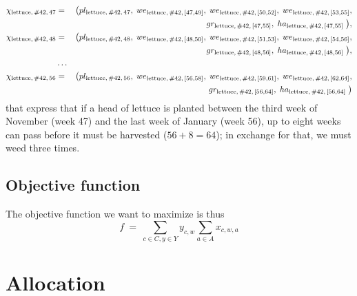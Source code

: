 \documentclass[11pt,reqno]{amsart}
\numberwithin{equation}{section}
\begin{document}
\begin{eqnarray*}
    \chi_{\text{lettuce},\, \text{\#42},\, 47} 
   &=& 
   \big(
      pl_{\text{lettuce},\, \text{\#42},\, 47}, \; 
      we_{\text{lettuce},\, \text{\#42},\, [47,49]}, \;
      we_{\text{lettuce},\, \text{\#42},\, [50,52]}, \;
      we_{\text{lettuce},\, \text{\#42},\, [53,55]}, 
   \\ && \hspace{5.4cm}
      gr_{\text{lettuce},\, \text{\#42},\, [47,55]}, \;
      ha_{\text{lettuce},\, \text{\#42},\, [47,55]} \;
      \big), \\
    \chi_{\text{lettuce},\, \text{\#42},\, 48} 
   &=& 
   \big(
      pl_{\text{lettuce},\, \text{\#42},\, 48}, \; 
      we_{\text{lettuce},\, \text{\#42},\, [48,50]}, \;
      we_{\text{lettuce},\, \text{\#42},\, [51,53]}, \;
      we_{\text{lettuce},\, \text{\#42},\, [54,56]}, 
   \\ && \hspace{5.4cm}
      gr_{\text{lettuce},\, \text{\#42},\, [48,56]}, \;
      ha_{\text{lettuce},\, \text{\#42},\, [48,56]} \;
      \big), \\
   &\dots& \\
   \chi_{\text{lettuce},\, \text{\#42},\, 56} 
   &=& 
   \big(
      pl_{\text{lettuce},\, \text{\#42},\, 56}, \; 
      we_{\text{lettuce},\, \text{\#42},\, [56,58]}, \;
      we_{\text{lettuce},\, \text{\#42},\, [59,61]}, \;
      we_{\text{lettuce},\, \text{\#42},\, [62,64]}, 
   \\ && \hspace{5.4cm}
      gr_{\text{lettuce},\, \text{\#42},\, [56,64]}, \;
      ha_{\text{lettuce},\, \text{\#42},\, [56,64]} \;
      \big)
\end{eqnarray*}
that express that if a head of lettuce is planted between the third week of November (week 47)
and the last week of January (week 56), up to eight weeks can pass before it must be
harvested ($56+8=64$); in exchange for that, we must weed three times. 


\subsection{Objective function}

The objective function we want to  maximize is thus
\[
   f 
   \ = \
   \sum_{c\in C, y\in Y} y_{c,w} \sum_{a\in A} x_{c,w,a}
\]


\section{Allocation}
\end{document}
